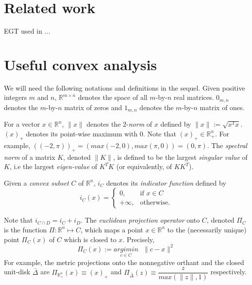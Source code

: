 \documentclass{article} %
\begin{document}

\section{Related work}
\label{sec:related_work}
EGT used in \cite{hoda2010smoothing}...

\section{Useful convex analysis}
\label{sec:notation}
We will need the following notations and definitions in the sequel. Given positive integers $m$ and $n$, $\mathbb{R}^{m \times n}$ denotes
the space of all $m$-by-$n$ real matrices. $0_{m,n}$ denotes the $m$-by-$n$ matrix of zeros and $1_{m,n}$ denotes the $m$-by-$n$ matrix of ones.

For a vector $x \in \mathbb{R}^n$, $\|x\|$ denotes the $2$-\textit{norm} of $x$ defined by $\|x\| := \sqrt{x^Tx}$.
$(x)_+$ denotes its point-wise maximum with 0. Note that $(x)_+ \in \mathbb{R}^n_+$.
For example, $((-2, \pi))_+ = (max(-2, 0), max(\pi, 0)) = (0, \pi)$. The \textit{spectral norm} of a matrix $K$,
denoted $\|K\|$, is defined to be the largest \textit{singular value} of $K$, i.e the largest \textit{eigen-value} of $K^TK$ (or equivalently, of $KK^T$).

Given a \textit{convex subset} $C$ of $\mathbb{R}^n$, $i_C$ denotes its \textit{indicator function} defined by
\begin{equation}
  i_C(x) = \begin{cases}
    0, &\mbox{if } x \in C\\
    +\infty, &\mbox{otherwise}.
    \end{cases}
  \end{equation}

Note that $i_{C \cap D} = i_C + i_D$. The \textit{euclidean projection operator} onto $C$, denoted $\Pi_C$ is the function
$\Pi: \mathbb{R}^n \mapsto C$, which maps a point $x \in \mathbb{R}^n$ to the (necessarily unique) point $\Pi_C(x)$ of $C$ which is closed to $x$. Precisely,
\begin{equation}
  \Pi_C(x) := \underset{c \in C}{argimin}\text{ }\|c - x\|^2
\end{equation}
For example, the metric projections onto the nonnegative orthant and the closed unit-disk $\bar{\Delta}$
are $\Pi_{\mathbb{R}^n_+}(x) \equiv (x)_+$ and $\Pi_{\bar{\Delta}}(z) \equiv \dfrac{z}{max(\|z\|, 1)}$ respectively.
\end{document}
